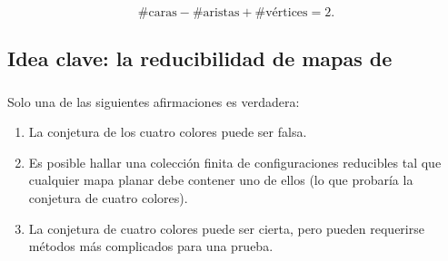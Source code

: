 \documentclass[spanish, utf8,handout]{beamer} %
\theoremstyle{definition}
\begin{document}
\begin{frame}\transblindsvertical
\frametitle{\insertsubsection}

\begin{theorem}
\begin{equation*}
\#\text{caras} - \#\text{aristas} + \#\text{vértices} = 2.	
\end{equation*}
\end{theorem}


\end{frame}

\subsection{Idea clave: la reducibilidad de mapas de \citeauthor{birkhoff}}

\begin{frame}
\frametitle{\insertsubsection}

\begin{theorem}\normalfont
Solo una de las siguientes afirmaciones es verdadera:

\begin{enumerate}
	\item La conjetura de los cuatro colores puede ser falsa.
	
	\item Es posible hallar una colección finita de configuraciones reducibles \linebreak tal que cualquier mapa planar debe contener uno de ellos \linebreak (lo que probaría la conjetura de cuatro colores).
	
	\item La conjetura de cuatro colores puede ser cierta, pero pueden \linebreak requerirse métodos más complicados para una prueba.
\end{enumerate}
\end{theorem}
\end{frame}
\end{document}
